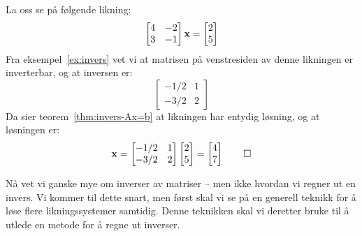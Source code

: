 \begin{ex}
La oss se på følgende likning:
\[
\begin{bmatrix}
 4 & -2 \\
 3 & -1
\end{bmatrix}
\mathbf{x}
=
\begin{bmatrix} 2 \\ 5 \end{bmatrix}
\]
Fra eksempel~\ref{ex:invers} vet vi at matrisen på venstresiden av
denne likningen er inverterbar, og at inversen er:
\[
\begin{bmatrix}
-1/2 & 1 \\
-3/2 & 2
\end{bmatrix}
\]
Da sier teorem~\ref{thm:invers-Ax=b} at likningen har entydig løsning,
og at løsningen er:
\[
\mathbf{x} =
\begin{bmatrix}
-1/2 & 1 \\
-3/2 & 2
\end{bmatrix}
\begin{bmatrix} 2 \\ 5 \end{bmatrix}
=
\begin{bmatrix} 4 \\ 7 \end{bmatrix}
\qedhere
\]
\end{ex}

Nå vet vi ganske mye om inverser av matriser -- men ikke hvordan vi
regner ut en invers.  Vi kommer til dette snart, men først skal vi se
på en generell teknikk for å løse flere likningssystemer samtidig.
Denne teknikken skal vi deretter bruke til å utlede en metode for å
regne ut inverser.









